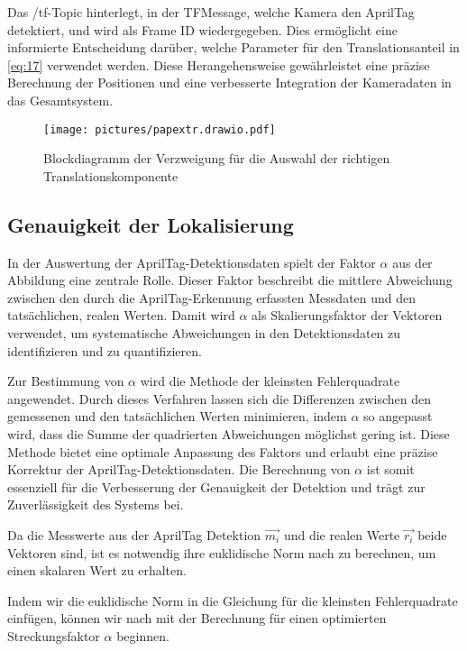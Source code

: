 \documentclass[ngerman]{article}    %
\theoremstyle{definition}
\begin{document}
Das /tf-Topic hinterlegt, in der TFMessage, welche Kamera den AprilTag detektiert, und wird als Frame ID wiedergegeben. Dies ermöglicht eine informierte Entscheidung darüber, welche Parameter für den Translationsanteil in \cref{eq:17} verwendet werden. Diese Herangehensweise gewährleistet eine präzise Berechnung der Positionen und eine verbesserte Integration der Kameradaten in das Gesamtsystem.

\begin{figure}[htb]
    \centering
    \texttt{[image: pictures/papextr.drawio.pdf]}
    \caption{Blockdiagramm der Verzweigung für die Auswahl der richtigen Translationskomponente}
    \label{fig:papextr}
\end{figure}

\newpage

\subsection{Genauigkeit der Lokalisierung}

In der Auswertung der AprilTag-Detektionsdaten spielt der Faktor \( \alpha \) aus der Abbildung eine zentrale Rolle. Dieser Faktor beschreibt die mittlere Abweichung zwischen den durch die AprilTag-Erkennung erfassten Messdaten und den tatsächlichen, realen Werten. Damit wird \( \alpha \) als Skalierungsfaktor der Vektoren verwendet, um systematische Abweichungen in den Detektionsdaten zu identifizieren und zu quantifizieren.

Zur Bestimmung von \( \alpha \) wird die Methode der kleinsten Fehlerquadrate angewendet. Durch dieses Verfahren lassen sich die Differenzen zwischen den gemessenen und den tatsächlichen Werten minimieren, indem \( \alpha \) so angepasst wird, dass die Summe der quadrierten Abweichungen möglichst gering ist. Diese Methode bietet eine optimale Anpassung des Faktors und erlaubt eine präzise Korrektur der AprilTag-Detektionsdaten. Die Berechnung von \( \alpha \) ist somit essenziell für die Verbesserung der Genauigkeit der Detektion und trägt zur Zuverlässigkeit des Systems bei.

Da die Messwerte aus der AprilTag Detektion \(\vec{m_i}\) und die realen Werte \(\vec{r_i}\) beide Vektoren sind, ist es notwendig ihre euklidische Norm nach \cite{kuhnel2011matrizen} zu berechnen, um einen skalaren Wert zu erhalten.
    
Indem wir die euklidische Norm in die Gleichung für die kleinsten Fehlerquadrate einfügen, können wir nach \cite{kauffmanndesign} mit der Berechnung für einen optimierten Streckungsfaktor \(\alpha\) beginnen.
\end{document}
